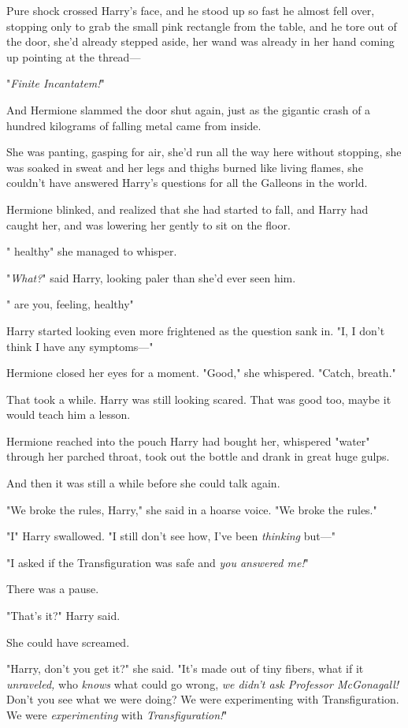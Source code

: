 Pure shock crossed Harry's face, and he stood up so fast he almost fell over,
stopping only to grab the small pink rectangle from the table, and he tore out
of the door, she'd already stepped aside, her wand was already in her hand
coming up pointing at the thread\mbox{---}

"\emph{Finite Incantatem!}"

And Hermione slammed the door shut again, just as the gigantic crash of a
hundred kilograms of falling metal came from inside.

She was panting, gasping for air, she'd run all the way here without stopping,
she was soaked in sweat and her legs and thighs burned like living flames, she
couldn't have answered Harry's questions for all the Galleons in the world.

Hermione blinked, and realized that she had started to fall, and Harry had
caught her, and was lowering her gently to sit on the floor.

"{\el} healthy{\el}" she managed to whisper.

"\emph{What?}" said Harry, looking paler than she'd ever seen him.

"{\el} are you, feeling, healthy{\el}"

Harry started looking even more frightened as the question sank in. "I, I don't
think I have any symptoms\mbox{---}"

Hermione closed her eyes for a moment. "Good," she whispered. "Catch, breath."

That took a while. Harry was still looking scared. That was good too, maybe it
would teach him a lesson.

Hermione reached into the pouch Harry had bought her, whispered "water" through
her parched throat, took out the bottle and drank in great huge gulps.

And then it was still a while before she could talk again.

"We broke the rules, Harry," she said in a hoarse voice. "We broke the rules."

"I{\el}" Harry swallowed. "I still don't see how, I've been \emph{thinking}
but\mbox{---}"

"I asked if the Transfiguration was safe and \emph{you answered me!}"

There was a pause.

"That's it?" Harry said.

She could have screamed.

"Harry, don't you get it?" she said. "It's made out of tiny fibers, what if it
\emph{unraveled,} who \emph{knows} what could go wrong, \emph{we didn't ask
Professor McGonagall!} Don't you see what we were doing? We were experimenting
with Transfiguration. We were \emph{experimenting} with \emph{Transfiguration!}"

